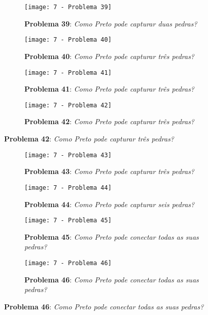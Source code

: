 \begin{figure}[h!]
    \centering
    \captionsetup{justification=raggedright,singlelinecheck=false}
    \begin{subfigure}[t]{.45\textwidth}
        \texttt{[image: 7 - Problema 39]}
        \caption*{\textbf{Problema 39}: \emph{Como Preto pode capturar duas pedras?}}
    \end{subfigure}
    \hspace{1cm}
    \begin{subfigure}[t]{.45\textwidth}
        \texttt{[image: 7 - Problema 40]}
        \caption*{\textbf{Problema 40}: \emph{Como Preto pode capturar três pedras?}}
    \end{subfigure}
    \par\bigskip
    \begin{subfigure}[t]{.45\textwidth}
        \texttt{[image: 7 - Problema 41]}
        \caption*{\textbf{Problema 41}: \emph{Como Preto pode capturar três pedras?}}
    \end{subfigure}
    \hspace{1cm}
    \begin{subfigure}[t]{.45\textwidth}
        \texttt{[image: 7 - Problema 42]}
        \caption*{\textbf{Problema 42}: \emph{Como Preto pode capturar três pedras?}}
    \end{subfigure}
\end{figure}

\pagebreak

\begin{figure}[h!]
    \centering
    \captionsetup{justification=raggedright,singlelinecheck=false}
    \begin{subfigure}[t]{.45\textwidth}
        \texttt{[image: 7 - Problema 43]}
        \caption*{\textbf{Problema 43}: \emph{Como Preto pode capturar três pedras?}}
    \end{subfigure}
    \hspace{1cm}
    \begin{subfigure}[t]{.45\textwidth}
        \texttt{[image: 7 - Problema 44]}
        \caption*{\textbf{Problema 44}: \emph{Como Preto pode capturar seis pedras?}}
    \end{subfigure}
    \par\bigskip
    \begin{subfigure}[t]{.45\textwidth}
        \texttt{[image: 7 - Problema 45]}
        \caption*{\textbf{Problema 45}: \emph{Como Preto pode conectar todas as suas pedras?}}
    \end{subfigure}
    \hspace{1cm}
    \begin{subfigure}[t]{.45\textwidth}
        \texttt{[image: 7 - Problema 46]}
        \caption*{\textbf{Problema 46}: \emph{Como Preto pode conectar todas as suas pedras?}}
    \end{subfigure}
\end{figure}

